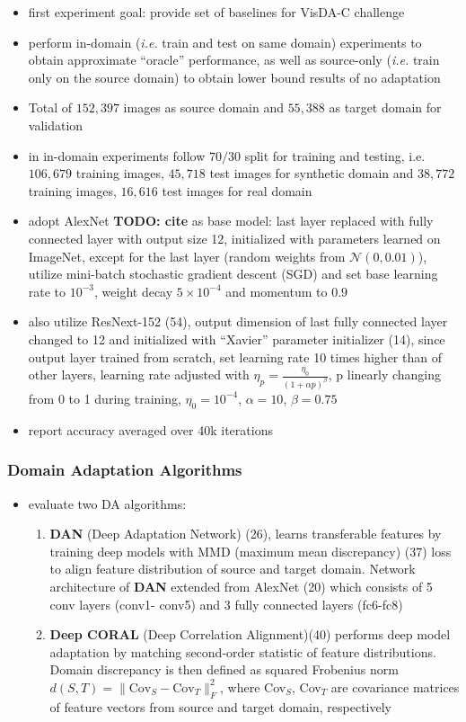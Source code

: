 \documentclass[]{article}
\newcommand{\todo}[1]{{\color{red}\bf{TODO: #1}}}
\begin{document}
\begin{itemize}
	\item first experiment goal: provide set of baselines for VisDA-C challenge
	\item perform in-domain (\textit{i.e.} train and test on same domain) experiments to obtain approximate ``oracle'' performance, as well as source-only (\textit{i.e.} train only on the source domain) to obtain lower bound results of no adaptation 
	\item Total of $152,397$ images as source domain and $55,388$ as target domain for validation
	\item in in-domain experiments follow $70/30$ split for training and testing, i.e. $106,679$ training images, $45,718$ test images for synthetic domain and $38,772$ training images, $16,616$ test images for real domain
	\item adopt AlexNet \todo{cite} as base model: last layer replaced with fully connected layer with output size 12, initialized with parameters learned on ImageNet, except for the last layer (random weights from $\mathcal{N}(0, 0.01)$), utilize mini-batch stochastic gradient descent (SGD) and set base learning rate to $10^{-3}$, weight decay $5\times 10^{-4}$ and momentum to $0.9$
	\item also utilize ResNext-152 (54), output dimension of last fully connected layer changed to 12 and initialized with ``Xavier'' parameter initializer (14), since output layer trained from scratch, set learning rate 10 times higher than of other layers, learning rate adjusted with $\eta_p = \frac{\eta_0}{(1+\alpha p)^\beta}$, p linearly changing from 0 to 1 during training, $\eta_0 = 10^{-4}$, $\alpha = 10$, $\beta = 0.75$
	\item report accuracy averaged over 40k iterations
\end{itemize}

\subsubsection{Domain Adaptation Algorithms}
\begin{itemize}
	\item evaluate two DA algorithms:
	\begin{enumerate}
		\item \textbf{DAN} (Deep Adaptation Network) (26), learns transferable features by training deep models with MMD (maximum mean discrepancy) (37) loss to align feature distribution of source and target domain. Network architecture of \textbf{DAN} extended from AlexNet (20) which consists of 5 conv layers (conv1- conv5) and 3 fully connected layers (fc6-fc8)
		\item \textbf{Deep CORAL} (Deep Correlation Alignment)(40) performs deep model adaptation by matching second-order statistic of feature distributions. Domain discrepancy is then defined as squared Frobenius norm $d(S,T) = \lVert \text{Cov}_S - \text{Cov}_T \rVert^2_F$, where Cov$_S$, Cov$_T$ are covariance matrices of feature vectors from source and target domain, respectively
	\end{enumerate}
\end{itemize}
\end{document}

